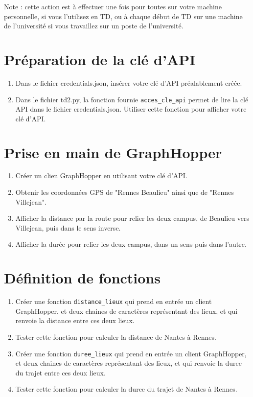 \documentclass[11pt,a4paper]{article}
\begin{document}
Note : cette action est à effectuer une fois pour toutes sur votre machine personnelle, si vous l’utilisez en TD, ou à chaque début de TD sur une machine de l’université si vous travaillez sur un poste de l’université.

\section{Préparation de la clé d'API}
\begin{enumerate}
    \item Dans le fichier credentials.json, insérer votre clé d'API préalablement créée.
    \item Dans le fichier td2.py, la fonction fournie \verb+acces_cle_api+ permet de lire la clé API dans le fichier credentials.json. 
    Utiliser cette fonction pour afficher votre clé d'API.
\end{enumerate}
        
\section{Prise en main de GraphHopper}
\begin{enumerate}
    \item Créer un clien GraphHopper en utilisant votre clé d'API.
    \item Obtenir les coordonnées GPS de "Rennes Beaulieu" ainsi que de "Rennes Villejean".
    \item Afficher la distance par la route pour relier les deux campus, de Beaulieu vers Villejean, puis dans le sens inverse.
    \item Afficher la durée pour relier les deux campus, dans un sens puis dans l'autre.
\end{enumerate}

\section{Définition de fonctions}
\begin{enumerate}
    \item Créer une fonction \verb+distance_lieux+ qui prend en entrée un client GraphHopper, et deux chaines de caractères représentant des lieux, et qui renvoie la distance entre ces deux lieux.
    \item Tester cette fonction pour calculer la distance de Nantes à Rennes.
    \item Créer une fonction \verb+duree_lieux+ qui prend en entrée un client GraphHopper, et deux chaines de caractères représentant des lieux, et qui renvoie la duree du trajet entre ces deux lieux.
    \item Tester cette fonction pour calculer la duree du trajet de Nantes à Rennes.
\end{enumerate}
\end{document}
